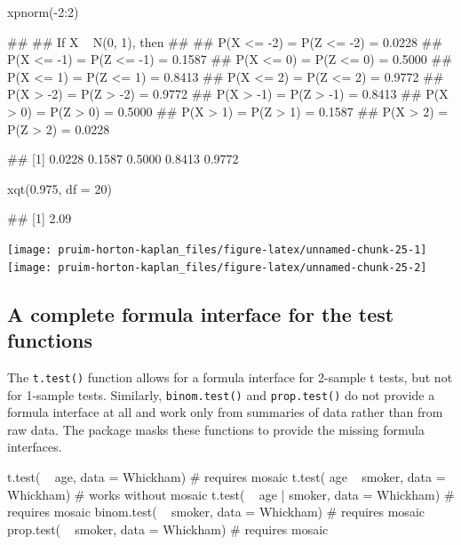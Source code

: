 \begin{Schunk}
\begin{Sinput}
xpnorm(-2:2)
\end{Sinput}
\begin{Soutput}
## 
## If X ~ N(0, 1), then 
## 
##  P(X <= -2) = P(Z <= -2) = 0.0228
##      P(X <= -1) = P(Z <= -1) = 0.1587
##      P(X <=  0) = P(Z <=  0) = 0.5000
##      P(X <=  1) = P(Z <=  1) = 0.8413
##      P(X <=  2) = P(Z <=  2) = 0.9772
##  P(X >  -2) = P(Z >  -2) = 0.9772
##      P(X >  -1) = P(Z >  -1) = 0.8413
##      P(X >   0) = P(Z >   0) = 0.5000
##      P(X >   1) = P(Z >   1) = 0.1587
##      P(X >   2) = P(Z >   2) = 0.0228
\end{Soutput}
\begin{Soutput}
## [1] 0.0228 0.1587 0.5000 0.8413 0.9772
\end{Soutput}
\begin{Sinput}
xqt(0.975, df = 20)
\end{Sinput}
\begin{Soutput}
## [1] 2.09
\end{Soutput}


\begin{center}\texttt{[image: pruim-horton-kaplan\_files/figure-latex/unnamed-chunk-25-1]} \texttt{[image: pruim-horton-kaplan\_files/figure-latex/unnamed-chunk-25-2]} \end{center}

\end{Schunk}

\subsection{A complete formula interface for the test
functions}\label{a-complete-formula-interface-for-the-test-functions}

The \texttt{t.test()} function allows for a formula interface for
2-sample t tests, but not for 1-sample tests. Similarly,
\texttt{binom.test()} and \texttt{prop.test()} do not provide a formula
interface at all and work only from summaries of data rather than from
raw data. The  package masks these functions to provide the
missing formula interfaces.

\begin{Schunk}
\begin{Sinput}
t.test( ~ age, data = Whickham)           # requires mosaic
t.test( age ~ smoker, data = Whickham)    # works without mosaic
t.test( ~ age | smoker, data = Whickham)  # requires mosaic
binom.test( ~ smoker, data = Whickham)    # requires mosaic
prop.test( ~ smoker, data = Whickham)     # requires mosaic
\end{Sinput}
\end{Schunk}

